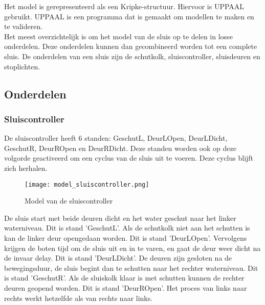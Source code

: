 \documentclass[../verslag.tex]{subfiles}
\begin{document}
Het model is gerepresenteerd als een Kripke-structuur. Hiervoor is UPPAAL gebruikt. UPPAAL is een programma dat is gemaakt om modellen te maken en te valideren.\\
Het meest overzichtelijk is om het model van de sluis op te delen in losse onderdelen. Deze onderdelen kunnen dan gecombineerd worden tot een complete sluis. De onderdelen van een sluis zijn de schutkolk, sluiscontroller, sluisdeuren en stoplichten.


\subsection{Onderdelen} 

\subsubsection{Sluiscontroller}
De sluiscontroller heeft 6 standen: GeschutL, DeurLOpen, DeurLDicht, GeschutR, DeurROpen en DeurRDicht.
Deze standen worden ook op deze volgorde geactiveerd om een cyclus van de sluis uit te voeren. Deze cyclus blijft zich herhalen.
\begin{figure}[H]
    \centering
    \texttt{[image: model\_sluiscontroller.png]}
    \caption{Model van de sluiscontroller}
\end{figure}
De sluis start met beide deuren dicht en het water geschut naar het linker waterniveau. Dit is stand 'GeschutL'. Als de schutkolk niet aan het schutten is kan de linker deur opengedaan worden. Dit is stand 'DeurLOpen'. Vervolgens krijgen de boten tijd om de sluis uit en in te varen, en gaat de deur weer dicht na de invaar delay. Dit is stand 'DeurLDicht'. De deuren zijn gesloten na de bewegingsduur, de sluis begint dan te schutten naar het rechter waterniveau. Dit is stand 'GeschutR'. Als de sluiskolk klaar is met schutten kunnen de rechter deuren geopend worden. Dit is stand 'DeurROpen'. Het proces van links naar rechts werkt hetzelfde als van rechts naar links.
\end{document}
